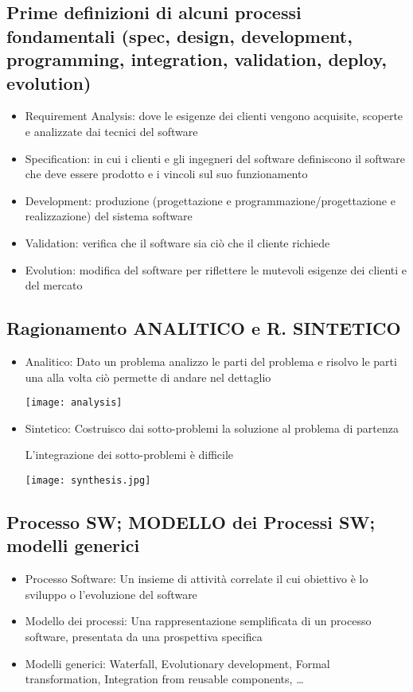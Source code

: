 \subsection{Prime definizioni di alcuni processi fondamentali (spec, design, development, programming, integration, validation, deploy, evolution)}
\begin{itemize}
    \item Requirement Analysis: dove le esigenze dei clienti vengono acquisite, scoperte e analizzate dai tecnici del software
    \item Specification: in cui i clienti e gli ingegneri del software definiscono il software che deve essere prodotto e i vincoli sul suo funzionamento
    \item Development: produzione (progettazione e programmazione/progettazione e realizzazione) del sistema software
    \item Validation: verifica che il software sia ciò che il cliente richiede
    \item Evolution: modifica del software per riflettere le mutevoli esigenze dei clienti e del mercato
\end{itemize}

\subsection{Ragionamento ANALITICO e R. SINTETICO}
\begin{itemize}
    \item Analitico: Dato un problema analizzo le parti del problema e risolvo le parti una alla volta ciò permette di andare nel dettaglio
    
    \texttt{[image: analysis]}
    \item Sintetico: Costruisco dai sotto-problemi la soluzione al problema di partenza
    
    L'integrazione dei sotto-problemi è difficile
    
    \texttt{[image: synthesis.jpg]}
\end{itemize}

\subsection{Processo SW; MODELLO dei Processi SW; modelli generici}
\begin{itemize}
    \item Processo Software: Un insieme di attività correlate il cui obiettivo è lo sviluppo o l'evoluzione del software
    \item Modello dei processi: Una rappresentazione semplificata di un processo software, presentata da una prospettiva specifica
    \item Modelli generici: Waterfall, Evolutionary development, Formal transformation, Integration from reusable components, \dots 
\end{itemize}

